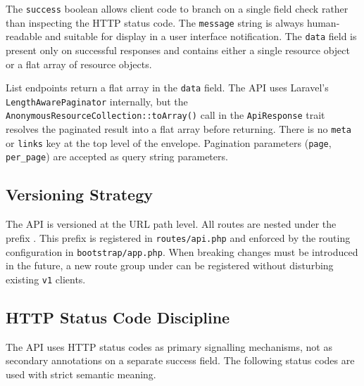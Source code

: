 The \texttt{success} boolean allows client code to branch on a single
field check rather than inspecting the HTTP status code. The
\texttt{message} string is always human-readable and suitable for display
in a user interface notification. The \texttt{data} field is present
only on successful responses and contains either a single resource
object or a flat array of resource objects.

\begin{notebox}[Pagination]
  List endpoints return a flat array in the \texttt{data} field. The API
  uses Laravel's \texttt{LengthAwarePaginator} internally, but the
  \texttt{AnonymousResourceCollection::toArray()} call in the
  \texttt{ApiResponse} trait resolves the paginated result into a flat
  array before returning. There is no \texttt{meta} or \texttt{links}
  key at the top level of the envelope. Pagination parameters
  (\texttt{page}, \texttt{per\_page}) are accepted as query string
  parameters.
\end{notebox}

\subsection{Versioning Strategy}

The API is versioned at the URL path level. All routes are nested under
the prefix . This prefix is registered in
\texttt{routes/api.php} and enforced by the routing configuration in
\texttt{bootstrap/app.php}. When breaking changes must be introduced in
the future, a new route group under  can be registered
without disturbing existing \texttt{v1} clients.

\subsection{HTTP Status Code Discipline}

The API uses HTTP status codes as primary signalling mechanisms, not as
secondary annotations on a separate success field. The following status
codes are used with strict semantic meaning.

